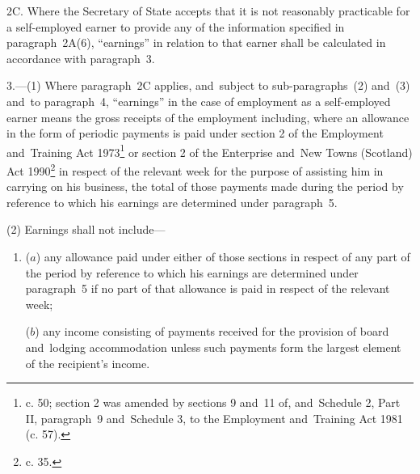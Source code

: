 \documentclass[12pt,a4paper]{article}
\begin{document}
2C.  Where the Secretary of State accepts that it is not reasonably practicable for a self-employed earner to provide any of the information specified in paragraph~2A(6), “earnings” in relation to that earner shall be calculated in accordance with paragraph~3.


\medskip

3.—(1) 
Where paragraph~2C applies, and~subject  %
to sub-paragraphs~(2) and~(3) and~to paragraph~4, “earnings” in the case of employment as a self-employed earner means the gross receipts of the employment including, where an allowance in the form of periodic payments is paid under section 2 of the Employment and~Training Act 1973\footnote{ c. 50; section 2 was amended by sections 9 and~11 of, and~Schedule 2, Part II, paragraph~9 and~Schedule 3, to the Employment and~Training Act 1981 (c. 57).} or section 2 of the Enterprise and~New Towns (Scotland) Act 1990\footnote{ c. 35.} in respect of the relevant week for the purpose of assisting him in carrying on his business, the total of those payments made during the period by reference to which his earnings are determined under paragraph~5.

(2) Earnings shall not include—
\begin{enumerate}\item[]
($a$) any allowance paid under either of those sections in respect of any part of the period by reference to which his earnings are determined under paragraph~5 if no part of that allowance is paid in respect of the relevant week;

($b$) any income consisting of payments received for the provision of board and~lodging accommodation unless such payments form the largest element of the recipient’s income.
\end{enumerate}
\end{document}
